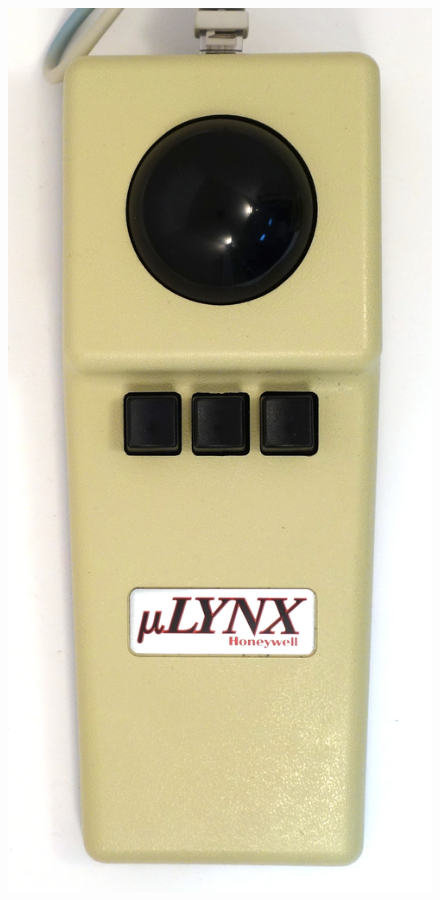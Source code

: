 \documentclass[11pt, a4paper]{article}
\begin{document}
\begin{figure}[h]
    \centering
    \includegraphics[scale=0.4]{1986_honeywell_microlynx_trackball/top_30.jpg}

\end{figure}
\end{document}
